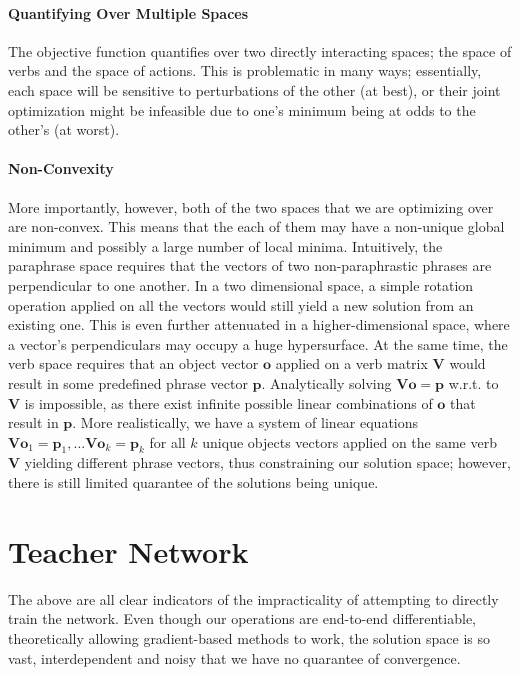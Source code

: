 \documentclass[a4paper,11pt]{article}
\begin{document}
\paragraph{Quantifying Over Multiple Spaces}
The objective function quantifies over two directly interacting spaces; the space of verbs and the space of actions. This is problematic in many ways; essentially, each space will be sensitive to perturbations of the other (at best), or their joint optimization might be infeasible due to one's minimum being at odds to the other's (at worst).

\paragraph{Non-Convexity}
More importantly, however, both of the two spaces that we are optimizing over are non-convex. This means that the each of them may have a non-unique global minimum and possibly a large number of local minima. Intuitively, the paraphrase space requires that the vectors of two non-paraphrastic phrases are perpendicular to one another. In a two dimensional space, a simple rotation operation applied on all the vectors would still yield a new solution from an existing one. This is even further attenuated in a higher-dimensional space, where a vector's perpendiculars may occupy a huge hypersurface. At the same time, the verb space requires that an object vector $\mathbf{o}$ applied on a verb matrix $\mathbf{V}$ would result in some predefined phrase vector $\mathbf{p}$. Analytically solving $\mathbf{V}\mathbf{o}=\mathbf{p}$ w.r.t. to $\mathbf{V}$ is impossible, as there exist infinite possible linear combinations of $\mathbf{o}$ that result in $\mathbf{p}$. More realistically, we have a system of linear equations $\mathbf{V}\mathbf{o}_1 = \mathbf{p}_1, \dots \mathbf{V}\mathbf{o}_k=\mathbf{p}_k$ for all $k$ unique objects vectors applied on the same verb $\mathbf{V}$ yielding different phrase vectors, thus constraining our solution space; however, there is still limited quarantee of the solutions being unique.

\section{Teacher Network}
The above are all clear indicators of the impracticality of attempting to directly train the network. Even though our operations are end-to-end differentiable, theoretically allowing gradient-based methods to work, the solution space is so vast, interdependent and noisy that we have no quarantee of convergence.
\end{document}
